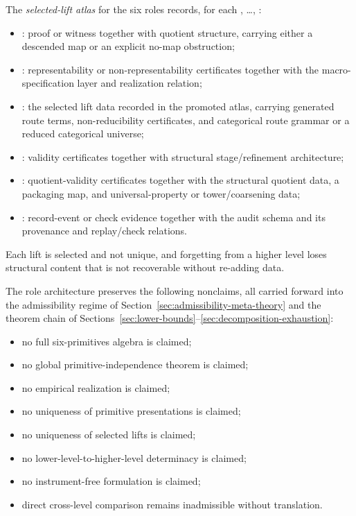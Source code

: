 \begin{definition}\label{def:selected-lift-atlas}
The \emph{selected-lift atlas} for the six roles records, for each
\Pone{}, \ldots, \Psix{}:
\begin{itemize}[topsep=2pt,itemsep=1pt]
  \item \Pone{}: proof or witness together with quotient structure, carrying
    either a descended map or an explicit no-map obstruction;
  \item \Ptwo{}: representability or non-representability certificates
    together with the macro-specification layer and realization relation;
  \item \Pthree{}: the selected lift data recorded in the promoted atlas,
    carrying generated route terms, non-reducibility certificates, and
    categorical route grammar or a reduced categorical universe;
  \item \Pfour{}: validity certificates together with structural
    stage/refinement architecture;
  \item \Pfive{}: quotient-validity certificates together with the
    structural quotient data, a packaging map, and universal-property or
    tower/coarsening data;
  \item \Psix{}: record-event or check evidence together with the audit
    schema and its provenance and replay/check relations.
\end{itemize}
Each lift is selected and not unique, and forgetting from a higher level
loses structural content that is not recoverable without re-adding data.
\end{definition}

\begin{remark}\label{rem:atlas-global-nonclaims}
The role architecture preserves the following nonclaims, all carried
forward into the admissibility regime of
Section~\ref{sec:admissibility-meta-theory} and the theorem chain of
Sections~\ref{sec:lower-bounds}--\ref{sec:decomposition-exhaustion}:
\begin{itemize}[topsep=2pt,itemsep=1pt]
  \item no full six-primitives algebra is claimed;
  \item no global primitive-independence theorem is claimed;
  \item no empirical realization is claimed;
  \item no uniqueness of primitive presentations is claimed;
  \item no uniqueness of selected lifts is claimed;
  \item no lower-level-to-higher-level determinacy is claimed;
  \item no instrument-free formulation is claimed;
  \item direct cross-level comparison remains inadmissible without
    translation.
\end{itemize}
\end{remark}
